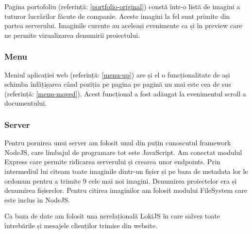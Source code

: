 Pagina portofoliu (referință: \ref{portfolio-original}) constă într-o listă de imagini a tuturor lucrărilor făcute de companie. Aceste imagini la fel sunt primite din partea serverului. Imaginile curente au aceleași evenimente ca și în preview care ne permite vizualizarea denumirii proiectului.


\subsubsection{Menu}

Meniul aplicației web (referință: \ref{menu-up}) are și el o funcționalitate de ași schimba înfățișarea când poziția pe pagina pe pagină nu mai este cea de sus (referință: \ref{menu-moved}). Acest funcțional a fost adăugat la evenimentul scroll a documentului.

\subsubsection{Server}

Pentru pornirea unui server am folosit unul din puțin cunoscutul framework NodeJS\cite{nodejs}, care limbajul de programare tot este JavaScript. Am conectat modulul Express\cite{expressjs} care permite ridicarea serverului și crearea unor endpoints.
Prin intermediul lui citeam toate imaginile dintr-un fișier și pe baza de metadata lor le ordonam pentru a trimite 9 cele mai noi imagini. Denumirea proiectelor era și denumirea fișierelor. Pentru citirea imaginilor am folosit modului FileSystem care este inclus in NodeJS.

Ca baza de date am folosit una nerelațională LokiJS\cite{lokijs} în care salvez toate întrebările și mesajele clienților trimise din website.

